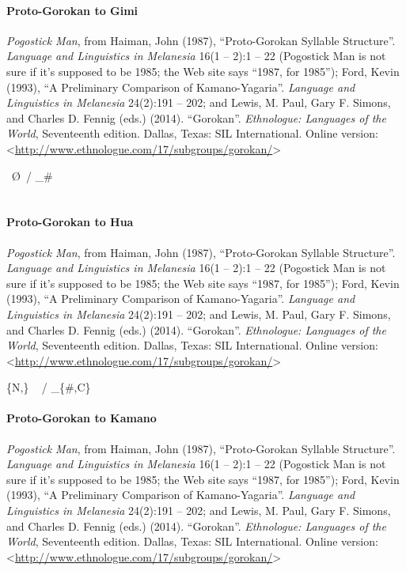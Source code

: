 \documentclass[11pt]{article}
\newcommand{\ipa}{\textipa}
\newcommand{\change}{\textrightarrow}
\begin{document}
\paragraph{Proto-Gorokan to Gimi}{\it Pogostick Man}, from Haiman, John (1987), ``Proto-Gorokan Syllable Structure''. {\it Language and Linguistics in Melanesia} 16(1 -- 2):1 -- 22 (Pogostick Man is not sure if it's supposed to be 1985; the Web site says ``1987, for 1985''); Ford, Kevin (1993), ``A Preliminary Comparison of Kamano-Yagaria''. {\it Language and Linguistics in Melanesia} 24(2):191 -- 202; and Lewis, M. Paul, Gary F. Simons, and Charles D. Fennig (eds.) (2014). ``Gorokan''. {\it Ethnologue: Languages of the World}, Seventeenth edition. Dallas, Texas: SIL International. Online version: \textless\url{http://www.ethnologue.com/17/subgroups/gorokan/}\textgreater

\ipa{P} \change\ \O\ / _\#\\
\ipa{Pv Pm Pg Pr} \change\ \ipa{t p k v}

\paragraph{Proto-Gorokan to Hua}{\it Pogostick Man}, from Haiman, John (1987), ``Proto-Gorokan Syllable Structure''. {\it Language and Linguistics in Melanesia} 16(1 -- 2):1 -- 22 (Pogostick Man is not sure if it's supposed to be 1985; the Web site says ``1987, for 1985''); Ford, Kevin (1993), ``A Preliminary Comparison of Kamano-Yagaria''. {\it Language and Linguistics in Melanesia} 24(2):191 -- 202; and Lewis, M. Paul, Gary F. Simons, and Charles D. Fennig (eds.) (2014). ``Gorokan''. {\it Ethnologue: Languages of the World}, Seventeenth edition. Dallas, Texas: SIL International. Online version: \textless\url{http://www.ethnologue.com/17/subgroups/gorokan/}\textgreater

\{N,\ipa{r}\} \change\ \ipa{P} / _\{\#,C\}

\paragraph{Proto-Gorokan to Kamano}{\it Pogostick Man}, from Haiman, John (1987), ``Proto-Gorokan Syllable Structure''. {\it Language and Linguistics in Melanesia} 16(1 -- 2):1 -- 22 (Pogostick Man is not sure if it's supposed to be 1985; the Web site says ``1987, for 1985''); Ford, Kevin (1993), ``A Preliminary Comparison of Kamano-Yagaria''. {\it Language and Linguistics in Melanesia} 24(2):191 -- 202; and Lewis, M. Paul, Gary F. Simons, and Charles D. Fennig (eds.) (2014). ``Gorokan''. {\it Ethnologue: Languages of the World}, Seventeenth edition. Dallas, Texas: SIL International. Online version: \textless\url{http://www.ethnologue.com/17/subgroups/gorokan/}\textgreater
\end{document}
